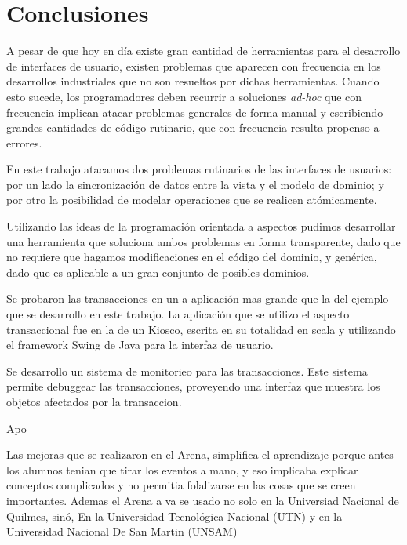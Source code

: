 \section{Conclusiones}
\label{sec:conclusions}
A pesar de que hoy en día existe gran cantidad de herramientas para el
desarrollo de interfaces de usuario, existen problemas que
aparecen con frecuencia en los desarrollos industriales que no son resueltos por
dichas herramientas.
 Cuando esto sucede, los programadores deben recurrir a soluciones \emph{ad-hoc}
que con frecuencia implican atacar problemas generales de forma manual y
escribiendo grandes cantidades de código rutinario, que con frecuencia resulta
propenso a errores.

En este trabajo atacamos dos problemas rutinarios de las interfaces de usuarios:
por un lado la sincronización de datos entre la vista y el modelo de dominio; y
por otro la posibilidad de modelar operaciones que se realicen atómicamente.

Utilizando las ideas de la programación orientada a aspectos pudimos desarrollar
una herramienta que soluciona ambos problemas en forma transparente, dado que no
requiere que hagamos modificaciones en el código del dominio, y genérica, dado
que es aplicable a un gran conjunto de posibles dominios.


Se probaron las transacciones en un a aplicación mas grande que la del ejemplo
que se desarrollo en este trabajo. La aplicación que se utilizo el aspecto
transaccional fue en la de un Kiosco, escrita en su totalidad en scala  y
utilizando el framework Swing de Java para la interfaz de usuario.

Se desarrollo un sistema de monitorieo para las transacciones. Este sistema
permite debuggear las transacciones, proveyendo una interfaz que muestra los
objetos afectados por la transaccion.

Apo

Las mejoras que se realizaron en el Arena, simplifica el aprendizaje porque
antes los alumnos tenian que tirar los eventos a mano, y eso implicaba explicar
conceptos complicados y no permitia folalizarse en las cosas que se creen importantes.
Ademas el Arena a va se usado no solo en la Universiad Nacional de Quilmes,
sinó, En la Universidad Tecnológica Nacional (UTN) y en la Universidad Nacional
De San Martin (UNSAM)
